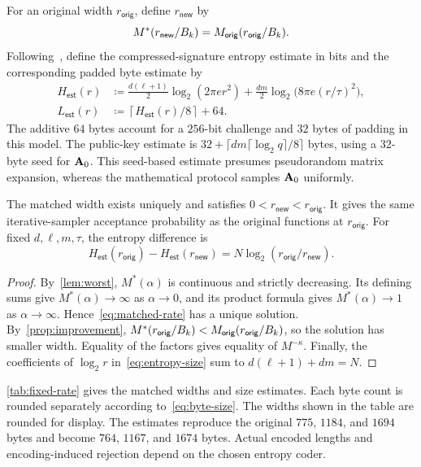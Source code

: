 \begin{definition}
\label{def:size-model}
For an original width $r_{\mathsf{orig}}$, define $r_{\mathsf{new}}$ by
\begin{equation}
\label{eq:matched-rate}
 M^*(r_{\mathsf{new}}/B_k)=M_{\mathsf{orig}}(r_{\mathsf{orig}}/B_k).
\end{equation}
Following~\cite[Equation~(8) and Appendix~A.2]{GartnerFull}, define the compressed-signature entropy estimate in bits and the corresponding padded byte estimate by
\begin{align}
 H_{\mathsf{est}}(r)&\coloneqq\frac{d(\ell+1)}2\log_2(2\pi e r^2)+\frac{dm}2\log_2\bigl(8\pi e(r/\tau)^2\bigr),\label{eq:entropy-size}\\
 L_{\mathsf{est}}(r)&\coloneqq\left\lceil H_{\mathsf{est}}(r)/8\right\rceil+64.\label{eq:byte-size}
\end{align}
The additive $64$ bytes account for a $256$-bit challenge and $32$ bytes of padding in this model. The public-key estimate is $32+\lceil dm\lceil\log_2q\rceil/8\rceil$ bytes, using a $32$-byte seed for $\mathbf{A}_0$. This seed-based estimate presumes pseudorandom matrix expansion, whereas the mathematical protocol samples $\mathbf{A}_0$ uniformly.
\end{definition}

\begin{proposition}
\label{prop:size-difference}
The matched width exists uniquely and satisfies $0<r_{\mathsf{new}}<r_{\mathsf{orig}}$. It gives the same iterative-sampler acceptance probability as the original functions at $r_{\mathsf{orig}}$. For fixed $d,\ell,m,\tau$, the entropy difference is
\[
 H_{\mathsf{est}}(r_{\mathsf{orig}})-H_{\mathsf{est}}(r_{\mathsf{new}})
 =N\log_2(r_{\mathsf{orig}}/r_{\mathsf{new}}).
\]
\end{proposition}
\begin{proof}
By~\cref{lem:worst}, $M^*(\alpha)$ is continuous and strictly decreasing. Its defining sums give $M^*(\alpha)\to\infty$ as $\alpha\to0$, and its product formula gives $M^*(\alpha)\to1$ as $\alpha\to\infty$. Hence~\cref{eq:matched-rate} has a unique solution. By~\cref{prop:improvement}, $M^*(r_{\mathsf{orig}}/B_k)<M_{\mathsf{orig}}(r_{\mathsf{orig}}/B_k)$, so the solution has smaller width. Equality of the factors gives equality of $M^{-\kappa}$. Finally, the coefficients of $\log_2r$ in~\cref{eq:entropy-size} sum to $d(\ell+1)+dm=N$.
\end{proof}

\cref{tab:fixed-rate} gives the matched widths and size estimates. Each byte count is rounded separately according to~\cref{eq:byte-size}. The widths shown in the table are rounded for display. The estimates reproduce the original $775$, $1184$, and $1694$ bytes and become $764$, $1167$, and $1674$ bytes. Actual encoded lengths and encoding-induced rejection depend on the chosen entropy coder.

